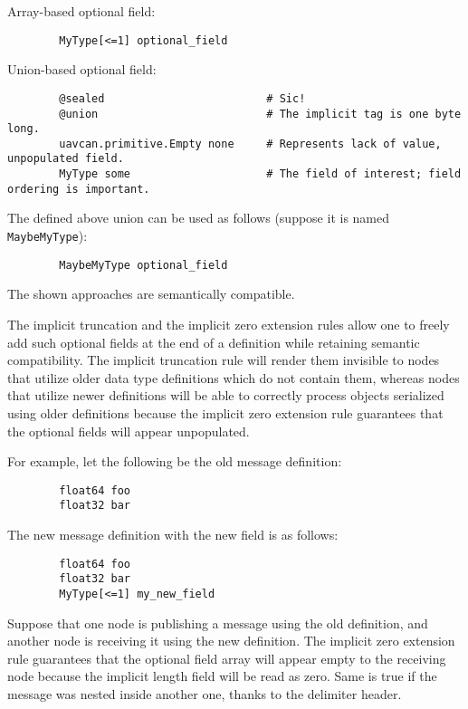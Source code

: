 \begin{remark}[breakable]
    Array-based optional field:

    \begin{verbatim}
        MyType[<=1] optional_field
    \end{verbatim}

    Union-based optional field:

    \begin{verbatim}
        @sealed                         # Sic!
        @union                          # The implicit tag is one byte long.
        uavcan.primitive.Empty none     # Represents lack of value, unpopulated field.
        MyType some                     # The field of interest; field ordering is important.
    \end{verbatim}

    The defined above union can be used as follows (suppose it is named \verb|MaybeMyType|):

    \begin{verbatim}
        MaybeMyType optional_field
    \end{verbatim}

    The shown approaches are semantically compatible.
\end{remark}

\begin{remark}[breakable]
    The implicit truncation and the implicit zero extension rules allow one to freely add such optional fields
    at the end of a definition while retaining semantic compatibility.
    The implicit truncation rule will render them invisible to nodes that utilize older data type definitions
    which do not contain them, whereas nodes that utilize newer definitions will be able to correctly process
    objects serialized using older definitions because the implicit zero extension rule guarantees
    that the optional fields will appear unpopulated.

    For example, let the following be the old message definition:

    \begin{verbatim}
        float64 foo
        float32 bar
    \end{verbatim}

    The new message definition with the new field is as follows:

    \begin{verbatim}
        float64 foo
        float32 bar
        MyType[<=1] my_new_field
    \end{verbatim}

    Suppose that one node is publishing a message using the old definition,
    and another node is receiving it using the new definition.
    The implicit zero extension rule guarantees that the optional field array will
    appear empty to the receiving node because the implicit length field will be read as zero.
    Same is true if the message was nested inside another one, thanks to the delimiter header.
\end{remark}

